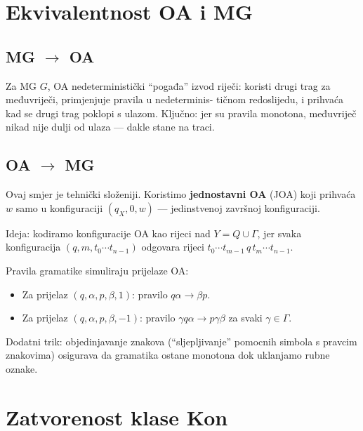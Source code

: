 \section{Ekvivalentnost OA i MG}

\subsection{MG $\to$ OA}

Za MG $G$, OA nedeterministički ``pogađa'' izvod riječi:
koristi drugi trag za međuvriječi, primjenjuje pravila u nedeterminis-
tičnom redoslijedu, i prihvaća kad se drugi trag poklopi s ulazom.
Ključno: jer su pravila monotona, međuvriječ nikad nije dulji od
ulaza --- dakle stane na traci.

\subsection{OA $\to$ MG}

Ovaj smjer je tehnički složeniji. Koristimo \textbf{jednostavni OA} (JOA)
koji prihvaća $w$ samo u konfiguraciji $(q_X, 0, w)$ --- jedinstvenoj
završnoj konfiguraciji.

Ideja: kodiramo konfiguracije OA kao rijeci nad $Y = Q \cup \Gamma$,
jer svaka konfiguracija $(q, m, t_0 \cdots t_{n-1})$ odgovara rijeci
$t_0 \cdots t_{m-1} \, q \, t_m \cdots t_{n-1}$.

Pravila gramatike simuliraju prijelaze OA:
\begin{itemize}
  \item Za prijelaz $(q, \alpha, p, \beta, 1)$: pravilo $q\alpha \to \beta p$.
  \item Za prijelaz $(q, \alpha, p, \beta, -1)$: pravilo $\gamma q\alpha \to p\gamma\beta$
        za svaki $\gamma \in \Gamma$.
\end{itemize}

Dodatni trik: objedinjavanje znakova (``sljepljivanje'' pomocnih
simbola s pravcim znakovima) osigurava da gramatika ostane monotona
dok uklanjamo rubne oznake.

\section{Zatvorenost klase Kon}

